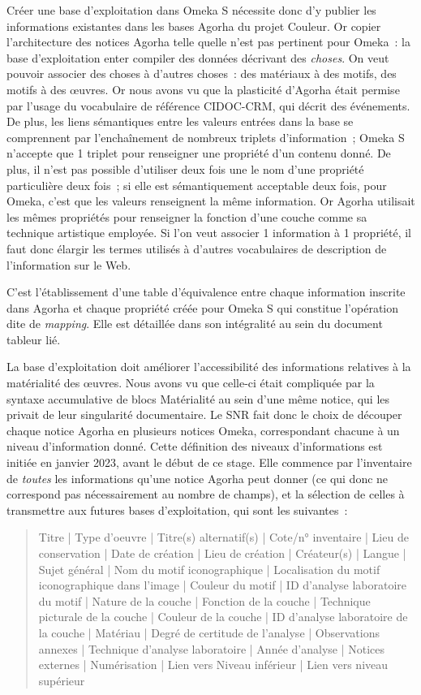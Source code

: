 \documentclass[a4paper,12pt, twoside]{book}
\begin{document}
Créer une base d’exploitation dans Omeka S nécessite donc d’y publier les informations existantes dans les bases Agorha du projet Couleur. Or copier l’architecture des notices Agorha telle quelle n’est pas pertinent pour Omeka~: la base d'exploitation enter compiler des données décrivant des \textit{choses}. On veut pouvoir associer des choses à d’autres choses~: des matériaux à des motifs, des motifs à des œuvres. Or nous avons vu que la plasticité d'Agorha était permise par l'usage du vocabulaire de référence CIDOC-CRM, qui décrit des événements. De plus, les liens sémantiques entre les valeurs entrées dans la base se comprennent par l’enchaînement de nombreux triplets d’information~; Omeka S n’accepte que 1 triplet pour renseigner une propriété d’un contenu donné. De plus, il n’est pas possible d’utiliser deux fois une le nom d’une propriété particulière deux fois~; si elle est sémantiquement acceptable deux fois, pour Omeka, c’est que les valeurs renseignent la même information. Or Agorha utilisait les mêmes propriétés pour renseigner la fonction d’une couche comme sa technique artistique employée. Si l’on veut associer 1 information à 1 propriété, il faut donc élargir les termes utilisés à d’autres vocabulaires de description de l’information sur le Web.

C’est l’établissement d’une table d’équivalence entre chaque information inscrite dans Agorha et chaque propriété créée pour Omeka S qui constitue l’opération dite de \textit{mapping}. Elle est détaillée dans son intégralité au sein du document tableur lié.

La base d’exploitation doit améliorer l’accessibilité des informations relatives à la matérialité des œuvres. Nous avons vu que celle-ci était compliquée par la syntaxe accumulative de blocs \textsf{Matérialité} au sein d’une même notice, qui les privait de leur singularité documentaire. Le SNR fait donc le choix de découper chaque notice Agorha en plusieurs notices Omeka, correspondant chacune à un niveau d’information donné. Cette définition des niveaux d’informations est initiée en janvier 2023, avant le début de ce stage. Elle commence par l’inventaire de \textit{toutes} les informations qu’une notice Agorha peut donner (ce qui donc ne correspond pas nécessairement au nombre de champs), et la sélection de celles à transmettre aux futures bases d’exploitation, qui sont les suivantes~:

\begin{quote}
    \textsf{Titre | Type d’oeuvre | Titre(s) alternatif(s) | Cote/n° inventaire | Lieu de conservation | Date de création | Lieu de création | Créateur(s) | Langue | Sujet général | Nom du motif iconographique | Localisation du motif iconographique dans l’image | Couleur du motif | ID d’analyse laboratoire du motif | Nature de la couche | Fonction de la couche | Technique picturale de la couche | Couleur de la couche | ID d’analyse laboratoire de la couche | Matériau | Degré de certitude de l’analyse | Observations annexes | Technique d’analyse laboratoire | Année d’analyse | Notices externes | Numérisation | Lien vers Niveau inférieur | Lien vers niveau supérieur}
\end{quote}
\end{document}
